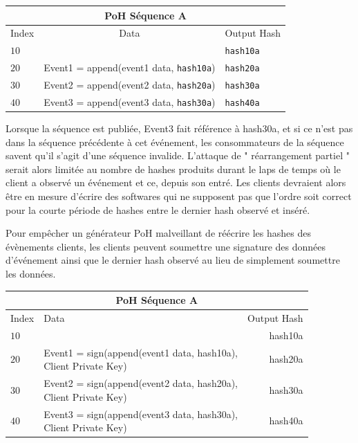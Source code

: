 \documentclass[12pt]{article}
\begin{document}
\begin{center}
  \begin{tabular}{  l  c l}

    \multicolumn{3}{c}{PoH Séquence A} \\
    \hline
    Index  & Data & Output Hash  \\ \hline
    $10$ & & \texttt{hash10a} \\
    $20$ & Event1 = append(event1 data, \texttt{hash10a}) & \texttt{hash20a}  \\
    $30$ & Event2 = append(event2 data, \texttt{hash20a}) & \texttt{hash30a} \\
    $40$ &  Event3 = append(event3 data, \texttt{hash30a}) & \texttt{hash40a} \\
    \end{tabular}
\end{center}

Lorsque la séquence est publiée, Event3 fait référence à hash30a, et si ce n'est pas dans la séquence précédente à cet événement, les consommateurs de la séquence savent qu'il s'agit d'une séquence invalide. L'attaque de " réarrangement partiel " serait alors limitée au nombre de hashes produits durant le laps de temps où le client a observé un événement et ce, depuis son entré. Les clients devraient alors être en mesure d'écrire des softwares qui ne supposent pas que l'ordre soit correct pour la courte période de hashes entre le dernier hash observé et inséré.

Pour empêcher un générateur PoH malveillant de réécrire les hashes des évènements clients, les clients peuvent soumettre une signature des données d'événement ainsi que le dernier hash observé au lieu de simplement soumettre les données.\\
\begin{center}
  \begin{tabular}{  l  l  r }
    \multicolumn{3}{c}{PoH Séquence A} \\
    \hline
    Index & Data & Output Hash \\ \hline
    $10$ & & hash10a  \\
    $20$ & \makecell{Event1 = sign(append(event1 data, hash10a), \\Client Private Key)} & hash20a\\
    $30$ & \makecell{Event2 = sign(append(event2 data, hash20a), \\Client Private Key)} & hash30a \\
    $40$ & \makecell{Event3 = sign(append(event3 data, hash30a), \\Client Private Key)} & hash40a \\

    \end{tabular}
\end{center}
\end{document}
